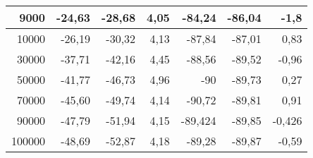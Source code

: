 \documentclass{article}
\begin{document}
\begin{table}[h!]
\begin{tabular}{|r|r|r|r|r|r|r|}
9000                                 & -24,63                                              & -28,68                             & 4,05                                     & -84,24                           & -86,04                                   & -1,8                                                                                        \\ \hline
10000                                & -26,19                                              & -30,32                             & 4,13                                     & -87,84                           & -87,01                                   & 0,83                                                                                        \\ \hline
30000                                & -37,71                                              & -42,16                             & 4,45                                     & -88,56                           & -89,52                                   & -0,96                                                                                       \\ \hline
50000                                & -41,77                                              & -46,73                             & 4,96                                     & -90                              & -89,73                                   & 0,27                                                                                        \\ \hline
70000                                & -45,60                                              & -49,74                             & 4,14                                     & -90,72                           & -89,81                                   & 0,91                                                                                        \\ \hline
90000                                & -47,79                                              & -51,94                             & 4,15                                     & -89,424                          & -89,85                                   & -0,426                                                                                      \\ \hline
100000                               & -48,69                                              & -52,87                             & 4,18                                     & -89,28                           & -89,87                                   & -0,59                                                                                       \\ \hline

\end{tabular}
\end{table}
\end{document}
